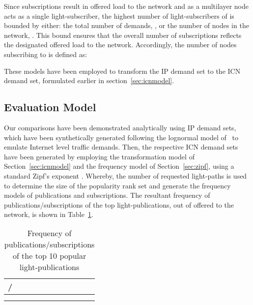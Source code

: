 \documentclass[journal]{IEEEtran}
\begin{document}
Since subscriptions result in offered load to the network and as a multilayer node acts as a single light-subscriber, the highest number of light-subscribers of  is bounded by either: the total number of demands, , or the number of nodes in the network, . This bound ensures that the overall number of subscriptions reflects the designated offered load to the network.
Accordingly, the number of nodes subscribing to  is defined as:

These models have been employed to transform the IP demand set to the ICN demand set, formulated earlier in section~\ref{sec:icnmodel}.

\subsection{Evaluation Model}
Our comparisons have been demonstrated analytically using IP demand sets, which have been synthetically generated following the lognormal model of~\cite{nuc:tm} to emulate Internet level traffic demands. Then, the respective ICN demand sets have been generated by employing the transformation model of Section~\ref{sec:icnmodel} and the frequency model of Section~\ref{sec:zipf}, using a standard Zipf's exponent . Whereby, the number of requested light-paths is used to determine the size of the popularity rank set and generate the frequency models of publications and subscriptions. 
The resultant frequency of publications/subscriptions of the top  light-publications, out of  offered to the network, is shown in Table~\ref{tab:frq}.
\begin{table}[tb]
  \centering
  \caption{Frequency of publications/subscriptions of the top 10 popular light-publications}
  \label{tab:frq}
  \begin{tabular}{l | c c c c c c c c c c}
  	\hline
    / &  &  &  &  &  &  &  &  &  & \\
     \hline 
    	 &  &  &  &  &  &  &  &  &  & \\ 
     &  &  &  &  &  &  &  &  &  & \\ 
    \hline 
  \end{tabular}
\end{table}
\end{document}
